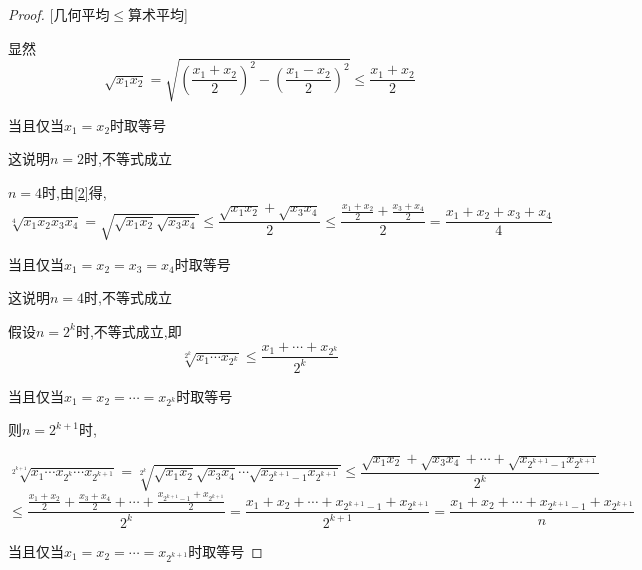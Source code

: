 \begin{proof}

    [几何平均$\le$算术平均]

    \vspace{4pt}

    显然
    \begin{equation}
        \sqrt{x_1x_2}=\sqrt{(\frac{x_1+x_2}{2})^2-(\frac{x_1-x_2}{2})^2}\le \frac{x_1+x_2}{2}   \label{2}
    \end{equation}

    当且仅当$x_1=x_2$时取等号

    这说明$n=2$时,不等式成立
    \vspace{6pt}

    $n=4$时,由\cref{2}得,
    \begin{equation}
        \sqrt[4]{x_1x_2x_3x_4}=\sqrt{\sqrt{x_1x_2}\sqrt{x_3x_4}}\le \frac{\sqrt{x_1x_2}+\sqrt{x_3x_4}}{2}\le \frac{\frac{x_1+x_2}{2}+\frac{x_3+x_4}{2}}{2}=\frac{x_1+x_2+x_3+x_4}{4}    \label{4递推}
    \end{equation}

    当且仅当$x_1=x_2=x_3=x_4$时取等号

    这说明$n=4$时,不等式成立
    \vspace{8pt}

    假设$n=2^k$时,不等式成立,即
    \begin{equation}
        \sqrt[2^k]{x_1\cdots x_{2^k}}\le \frac{x_1+\cdots+x_{2^k}}{2^k}
    \end{equation}

    当且仅当$x_1=x_2=\cdots = x_{2^k}$时取等号

    \vspace{8pt}

    则$n=2^{k+1}$时,

    \begin{equation*}
        \sqrt[2^{k+1}]{x_1\cdots x_{2^k}\cdots x_{2^{k+1}}}=\sqrt[2^k]{\sqrt{x_1 x_2} \sqrt{x_3 x_4} \cdots \sqrt{x_{2^{k+1}-1} x_{2^{k+1}}}}\le \frac{\sqrt{x_1 x_2}+\sqrt{x_3 x_4}+\cdots+\sqrt{x_{2^{k+1}-1} x_{2^{k+1}}}}{2^k}
    \end{equation*}
    \begin{equation}
        \le \frac{ \frac{x_1+x_2}{2} + \frac{x_3+x_4}{2} + \cdots + \frac{x_{2^{k+1}-1}+x_{2^{k+1}}}{2}}{2^k} = \frac{x_1+x_2+\cdots + x_{2^{k+1}-1}+x_{2^{k+1}}}{2^{k+1}}=\frac{x_1+x_2+\cdots + x_{2^{k+1}-1}+x_{2^{k+1}}}{n}
    \end{equation}

    当且仅当$x_1=x_2=\cdots = x_{2^{k+1}}$时取等号


\end{proof}

